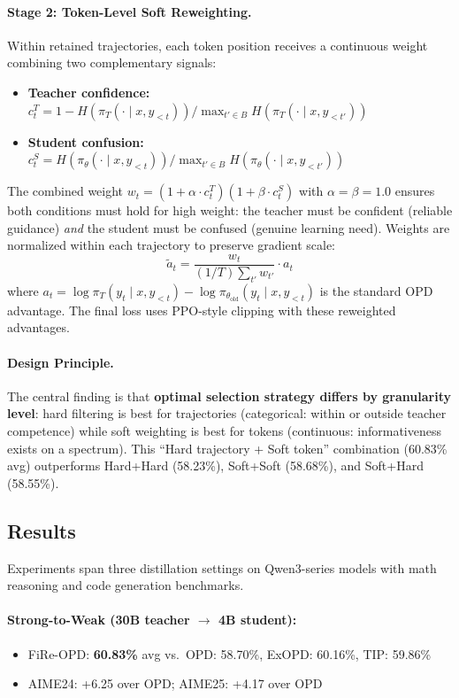 \documentclass[11pt,a4paper]{article}
\begin{document}
\paragraph{Stage 2: Token-Level Soft Reweighting.}
Within retained trajectories, each token position receives a continuous weight combining two complementary signals:
\begin{itemize}
\item \textbf{Teacher confidence:} $c_t^T = 1 - H(\pi_T(\cdot \mid x, y_{<t})) / \max_{t' \in B} H(\pi_T(\cdot \mid x, y_{<t'}))$
\item \textbf{Student confusion:} $c_t^S = H(\pi_\theta(\cdot \mid x, y_{<t})) / \max_{t' \in B} H(\pi_\theta(\cdot \mid x, y_{<t'}))$
\end{itemize}
The combined weight $w_t = (1 + \alpha \cdot c_t^T)(1 + \beta \cdot c_t^S)$ with $\alpha{=}\beta{=}1.0$ ensures both conditions must hold for high weight: the teacher must be confident (reliable guidance) \emph{and} the student must be confused (genuine learning need). Weights are normalized within each trajectory to preserve gradient scale:
\begin{equation}
\tilde{a}_t = \frac{w_t}{(1/T)\sum_{t'} w_{t'}} \cdot a_t
\end{equation}
where $a_t = \log \pi_T(y_t \mid x, y_{<t}) - \log \pi_{\theta_{\mathrm{old}}}(y_t \mid x, y_{<t})$ is the standard OPD advantage. The final loss uses PPO-style clipping with these reweighted advantages.

\paragraph{Design Principle.}
The central finding is that \textbf{optimal selection strategy differs by granularity level}: hard filtering is best for trajectories (categorical: within or outside teacher competence) while soft weighting is best for tokens (continuous: informativeness exists on a spectrum). This ``Hard trajectory + Soft token'' combination (60.83\% avg) outperforms Hard+Hard (58.23\%), Soft+Soft (58.68\%), and Soft+Hard (58.55\%).

\subsection{Results}

Experiments span three distillation settings on Qwen3-series models with math reasoning and code generation benchmarks.

\paragraph{Strong-to-Weak (30B teacher $\to$ 4B student):}
\begin{itemize}
\item FiRe-OPD: \textbf{60.83\%} avg vs.\ OPD: 58.70\%, ExOPD: 60.16\%, TIP: 59.86\%
\item AIME24: +6.25 over OPD; AIME25: +4.17 over OPD
\end{itemize}
\end{document}
